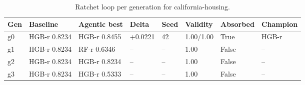 \begin{table}[H]
\centering\small
\caption{Ratchet loop per generation for california-housing.}
\label{tab:ratchet-generations-ratchet-ledger-california-housing}
\begin{tabular}{llllllll}
\toprule
Gen & Baseline & Agentic best & Delta & Seed & Validity & Absorbed & Champion \\
\midrule
g0 & HGB-r 0.8234 & HGB-r 0.8455 & +0.0221 & 42 & 1.00/1.00 & True & HGB-r \\
g1 & HGB-r 0.8234 & RF-r 0.6346 & -- & -- & 1.00 & False & -- \\
g2 & HGB-r 0.8234 & HGB-r 0.8234 & -- & -- & 1.00 & False & -- \\
g3 & HGB-r 0.8234 & HGB-r 0.5333 & -- & -- & 1.00 & False & -- \\
\bottomrule
\end{tabular}
\end{table}
